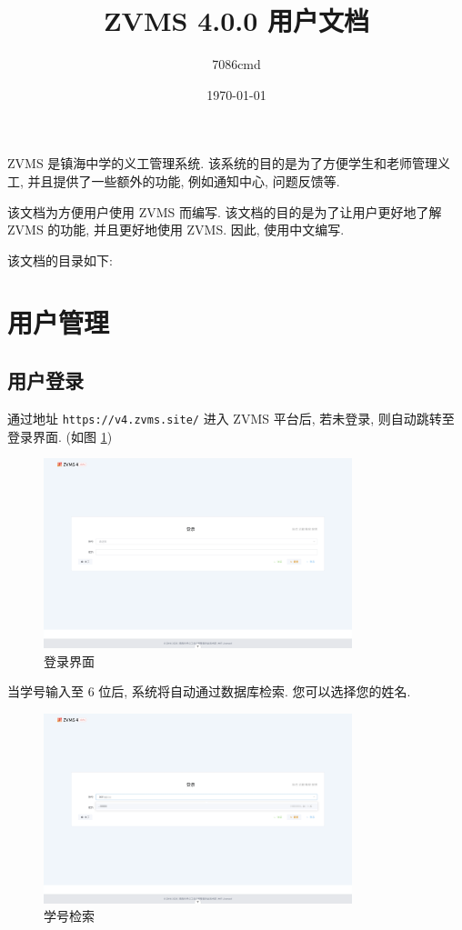 \documentclass{article}
\title{ZVMS 4.0.0 用户文档}
\author{7086cmd}
\date{\today}
\begin{document}
\maketitle

ZVMS 是镇海中学的义工管理系统. 该系统的目的是为了方便学生和老师管理义工, 并且提供了一些额外的功能, 例如通知中心, 问题反馈等.

该文档为方便用户使用 ZVMS 而编写. 该文档的目的是为了让用户更好地了解 ZVMS 的功能, 并且更好地使用 ZVMS. 因此, 使用中文编写.

该文档的目录如下:

\tableofcontents

\section{用户管理}

\subsection{用户登录}

通过地址 \texttt{https://v4.zvms.site/} 进入 ZVMS 平台后, 若未登录, 则自动跳转至登录界面. (如图 \ref{fig:login})

\begin{figure}[H]
  \centering
  \includegraphics[width=0.8\textwidth]{../assets/image-20240303151532382.png}
  \caption{登录界面}
  \label{fig:login}
\end{figure}

当学号输入至 $6$ 位后, 系统将自动通过数据库检索. 您可以选择您的姓名.

\begin{figure}[H]
  \centering
  \includegraphics[width=0.8\textwidth]{../assets/image-20240303151823285.png}
  \caption{学号检索}
  \label{fig:search}
\end{figure}
\end{document}
